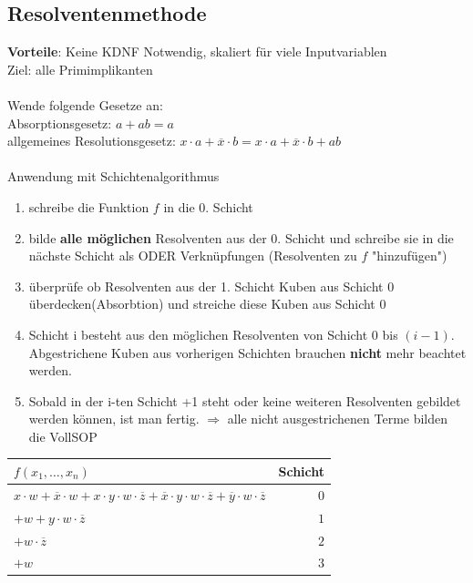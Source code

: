 \documentclass[6pt,a4paper]{scrartcl}
\newcommand{\Ra}[0]{\ensuremath{\Rightarrow}}									%
\begin{document}
\begin{multicols*}{3}
	\subsection{Resolventenmethode} %
	\label{sec:Resolventenmethode}
		\textbf{Vorteile}: Keine KDNF Notwendig, skaliert für viele Inputvariablen\\
		Ziel: alle Primimplikanten \\ \\
		Wende folgende Gesetze an: \\
		Absorptionsgesetz: $a + ab = a$ \\
		allgemeines Resolutionsgesetz: $x \cdot a + \overline x \cdot b = x \cdot a + \overline x \cdot b + ab$ \\
		\\
		Anwendung mit Schichtenalgorithmus
		\begin{enumerate}
			\item schreibe die Funktion $f$ in die 0. Schicht
			\item bilde \textbf{alle möglichen} Resolventen aus der 0. Schicht und schreibe sie in die nächste Schicht als ODER Verknüpfungen (Resolventen zu $f$ "hinzufügen")
			\item überprüfe ob Resolventen aus der 1. Schicht Kuben aus Schicht 0 überdecken(Absorbtion) und streiche diese Kuben aus Schicht 0
			\item Schicht i besteht aus den möglichen Resolventen von Schicht 0 bis $(i-1)$. Abgestrichene Kuben aus vorherigen Schichten brauchen \textbf{nicht} mehr beachtet werden.
			\item Sobald in der i-ten Schicht +1 steht oder keine weiteren Resolventen gebildet werden können, ist man fertig. 
			$\Ra $ alle nicht ausgestrichenen Terme bilden die VollSOP
		\end{enumerate}
		
		\begin{tabular}{l | r}
		$f(x_1, \ldots, x_n)$ & Schicht \\ \midrule
		$x \cdot w + \overline x \cdot w + x \cdot y \cdot w \cdot \overline z + \overline x \cdot y \cdot w \cdot \overline z + \overline y \cdot w \cdot \overline z $& $0$ \\
		$+ w + y \cdot w \cdot \overline z$ & $1$ \\
		$+ w \cdot \overline z $ & $2$ \\
		$+ w$ &$ 3$
		\end{tabular}


\end{multicols*}
\end{document}
